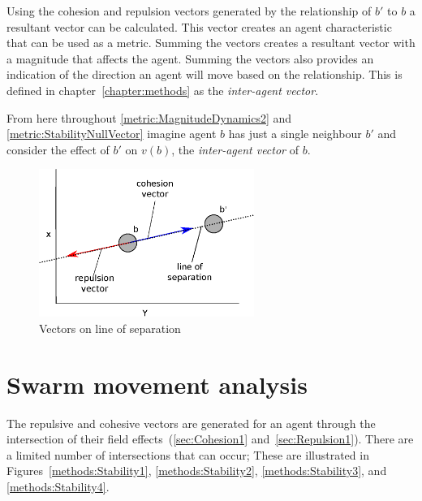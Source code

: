 Using the cohesion and repulsion vectors generated by the relationship of $b'$ to $b$ a resultant vector can be calculated. This vector creates an agent characteristic that can be used as a metric. Summing the vectors creates a resultant vector with a magnitude that affects the agent. Summing the vectors also provides an indication of the direction an agent will move based on the relationship. This is defined in chapter~\ref{chapter:methods} as the \textit{inter-agent vector}.

From here throughout \autoref{metric:MagnitudeDynamics2} and \autoref{metric:StabilityNullVector} imagine agent $b$ has just a single neighbour $b'$ and consider the effect of $b'$ on $v(b)$, the \textit{inter-agent vector} of $b$.

\begin{figure}[H]
\begin{center}
\includegraphics[width=7cm]{CHAPTER-4/figures/Stability5}
\end{center}
\caption{Vectors on line of separation} \label{methods:Stability5}
\end{figure}

\section{Swarm movement analysis\label{metric:MagnitudeDynamics2}}
The repulsive and cohesive vectors are generated for an agent through the intersection of their field effects~(\autoref{sec:Cohesion1} and~\autoref{sec:Repulsion1}). There are a limited number of intersections that can occur; These are illustrated in Figures~\ref{methods:Stability1}, \ref{methods:Stability2}, \ref{methods:Stability3},  and \ref{methods:Stability4}.

